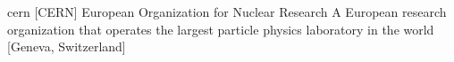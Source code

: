\newglsXinstitution%
{cern}%
[CERN]%
{European Organization for Nuclear Research}%
{A European research organization that operates the largest particle physics laboratory in the world \cite{website:CERN}}%
[Geneva, Switzerland]%